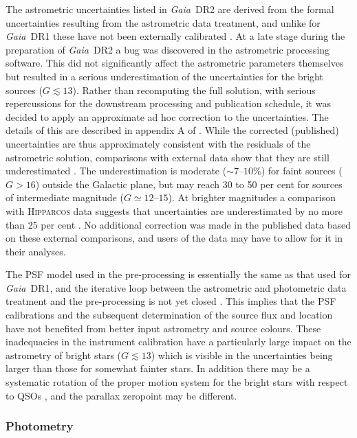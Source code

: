 \documentclass[longauth]{aa_gaia} %
\newcommand\gaia{\textit{Gaia}}
\newcommand\gdr[1]{\gaia~DR#1}
\newcommand\hip{\textsc{Hipparcos}}
\newcommand\tabref[1]{Table~\ref{#1}}
\begin{document}
The astrometric uncertainties listed in \gdr{2} are derived from the formal uncertainties resulting
from the astrometric data treatment, and unlike for \gdr{1} these have not been externally
calibrated \citep[by comparison to the {\hip} data,][]{2016A&A...595A...4L}. At a late stage during
the preparation of \gdr{2} a bug was discovered in the astrometric processing software. This did not
significantly affect the astrometric parameters themselves but resulted in a serious underestimation
of the uncertainties for the bright sources ($G\lesssim 13$). Rather than recomputing the full
solution, with serious repercussions for the downstream processing and publication schedule, it was
decided to apply an approximate ad hoc correction to the uncertainties. The details of this are
described in appendix A of \cite{DR2-DPACP-51}. While the corrected (published) uncertainties are
thus approximately consistent with the residuals of the astrometric solution, comparisons with
external data show that they are still underestimated \citep{DR2-DPACP-39}. The underestimation is
moderate ($\sim7$--$10$\%) for faint sources ($G>16$) outside the Galactic plane, but may reach 30
to 50 per cent for sources of intermediate magnitude ($G\simeq 12$--$15$). At brighter magnitudes a
comparison with {\hip} data suggests that uncertainties are underestimated by no more than 25 per
cent \citep{DR2-DPACP-39}. No additional correction was made in the published data based on these
external comparisons, and users of the data may have to allow for it in their analyses.

The PSF model used in the pre-processing is essentially the same as that used for \gdr{1}, and the
iterative loop between the astrometric and photometric data treatment and the pre-processing is not
yet closed \citep[see section 6.1 and figure 10 in][]{2016A&A...595A...2G}. This implies that the
PSF calibrations and the subsequent determination of the source flux and location have not benefited
from better input astrometry and source colours. These inadequacies in the instrument calibration
have a particularly large impact on the astrometry of bright stars ($G\lesssim13$) which is visible
in the uncertainties being larger than those for somewhat fainter stars. In addition there may be a
systematic rotation of the proper motion system for the bright stars with respect to QSOs \citep[see
\tabref{tab:qualitystats} and][]{DR2-DPACP-51}, and the parallax zeropoint may be different.

\subsubsection{Photometry}
\label{sec:photcaveats}
\end{document}
